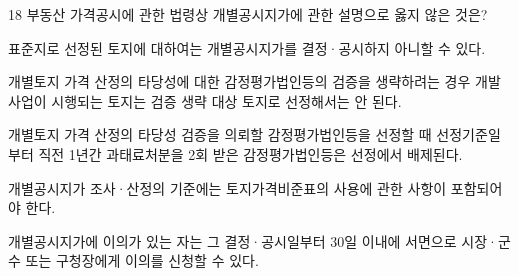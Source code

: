 \begin{question}{18}
부동산 가격공시에 관한 법령상 개별공시지가에 관한 설명으로 옳지 않은 것은?
\begin{choices}
  \item 표준지로 선정된 토지에 대하여는 개별공시지가를 결정·공시하지 아니할 수 있다.
  \item 개별토지 가격 산정의 타당성에 대한 감정평가법인등의 검증을 생략하려는 경우 개발사업이 시행되는 토지는 검증 생략 대상 토지로 선정해서는 안 된다.
  \item 개별토지 가격 산정의 타당성 검증을 의뢰할 감정평가법인등을 선정할 때 선정기준일부터 직전 1년간 과태료처분을 2회 받은 감정평가법인등은 선정에서 배제된다.
  \item 개별공시지가 조사·산정의 기준에는 토지가격비준표의 사용에 관한 사항이 포함되어야 한다.
  \item 개별공시지가에 이의가 있는 자는 그 결정·공시일부터 30일 이내에 서면으로 시장·군수 또는 구청장에게 이의를 신청할 수 있다.
\end{choices}
\end{question}
